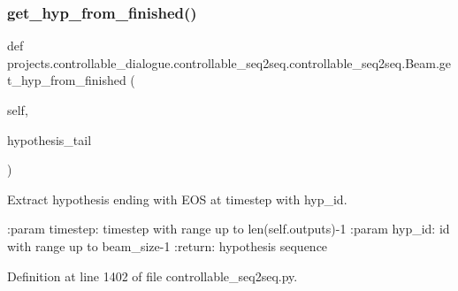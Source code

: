 \subsubsection{\texorpdfstring{get\+\_\+hyp\+\_\+from\+\_\+finished()}{get\_hyp\_from\_finished()}}
{\footnotesize\ttfamily def projects.\+controllable\+\_\+dialogue.\+controllable\+\_\+seq2seq.\+controllable\+\_\+seq2seq.\+Beam.\+get\+\_\+hyp\+\_\+from\+\_\+finished (\begin{DoxyParamCaption}\item[{}]{self,  }\item[{}]{hypothesis\+\_\+tail }\end{DoxyParamCaption})}

\begin{DoxyVerb}Extract hypothesis ending with EOS at timestep with hyp_id.

:param timestep:
    timestep with range up to len(self.outputs)-1
:param hyp_id:
    id with range up to beam_size-1
:return:
    hypothesis sequence
\end{DoxyVerb}
 

Definition at line 1402 of file controllable\+\_\+seq2seq.\+py.


